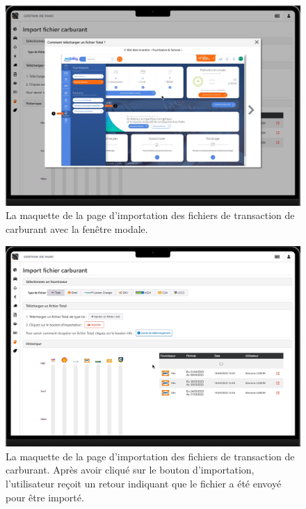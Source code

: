 \begin{figure}[ht]
    \centering
    \includegraphics[width=\textwidth]{img/frontend-maquettage-total-modal}
    \caption{La maquette de la page d'importation des fichiers de transaction de carburant avec la fenêtre modale.}
    \label{fig:frontend-maquettage-total-modal}
\end{figure}

\begin{figure}[ht]
    \centering
    \includegraphics[width=\textwidth]{img/frontend-maquettage-total-file-sent}
    \caption{La maquette de la page d'importation des fichiers de transaction de carburant. Après avoir cliqué sur le bouton d'importation, l'utilisateur reçoit un retour indiquant que le fichier a été envoyé pour être importé.}
    \label{fig:frontend-maquettage-total-file-sent}
\end{figure}


